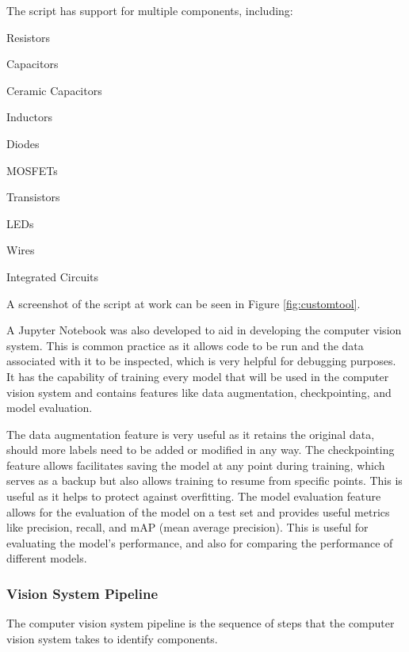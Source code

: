 The script has support for multiple components, including:
\begin{multicols}{2}
    \begin{mylist}
        \item Resistors
        \item Capacitors
        \item Ceramic Capacitors
        \item Inductors
        \item Diodes
        \item MOSFETs
        \item Transistors
        \item LEDs
        \item Wires
        \item Integrated Circuits
    \end{mylist}
\end{multicols}

\noindent
A screenshot of the script at work can be seen in Figure \ref{fig:customtool}.

A Jupyter Notebook\cite{jupyter} was also developed to aid in developing the computer vision system. This is common practice as it
allows code to be run and the data associated with it to be inspected, which is very helpful for debugging purposes. It 
has the capability of training every model that will be used in the computer vision system and contains features like
data augmentation, checkpointing, and model evaluation.

The data augmentation feature is very useful as it retains the original data, should more labels need to be added or modified in any way. The checkpointing feature allows
facilitates saving the model at any point during training, which serves as a backup but also allows training to resume from specific points. This is useful as it helps
to protect against overfitting. The model evaluation feature allows for the evaluation of the model on a test set and provides
useful metrics like precision, recall, and mAP (mean average precision). This is useful for evaluating the model's performance, and also for
comparing the performance of different models.

\subsubsection{Vision System Pipeline}
The computer vision system pipeline is the sequence of steps that the computer vision system takes to identify components.

